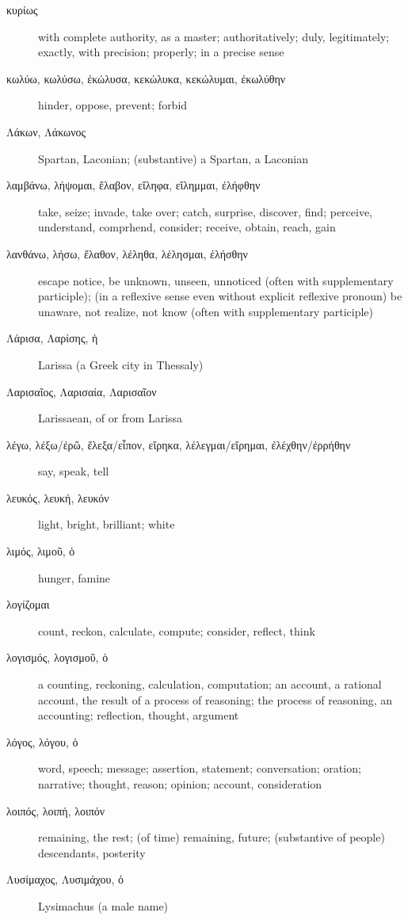 \documentclass[12pt,letterpaper]{article}
\begin{document}
\begin{description}
    \item[\textgreek{κυρίως}] \marginnote{*}with complete authority, as a master; authoritatively; duly, legitimately; exactly, with precision; properly; in a precise sense
    \item[\textgreek{κωλύω, κωλύσω, ἐκώλυσα, κεκώλυκα, κεκώλυμαι, ἐκωλύθην}] \marginnote{*}hinder, oppose, prevent; forbid
    \item[\textgreek{Λάκων, Λάκωνος}] Spartan, Laconian; (substantive) a Spartan, a Laconian
    \item[\textgreek{λαμβάνω, λήψομαι, ἔλαβον, εἴληφα, εἴλημμαι, ἐλήφθην}] \marginnote{*}take, seize; invade, take over; catch, surprise, discover, find; perceive, understand, comprhend, consider; receive, obtain, reach, gain
    \item[\textgreek{λανθάνω, λήσω, ἔλαθον, λέληθα, λέλησμαι, ἐλήσθην}] \marginnote{*}escape notice, be unknown, unseen, unnoticed (often with supplementary participle); (in a reflexive sense even without explicit reflexive pronoun) be unaware, not realize, not know (often with supplementary participle)
    \item[\textgreek{Λάρισα, Λαρίσης, ἡ}] Larissa (a Greek city in Thessaly)
    \item[\textgreek{Λαρισαῖος, Λαρισαία, Λαρισαῖον}] Larissaean, of or from Larissa
    \item[\textgreek{λέγω, λέξω/ἐρῶ, ἔλεξα/εἶπον, εἴρηκα, λέλεγμαι/εἴρημαι, ἐλέχθην/ἐρρήθην}] \marginnote{*}say, speak, tell
    \item[\textgreek{λευκός, λευκή, λευκόν}] light, bright, brilliant; white
    \item[\textgreek{λιμός, λιμοῦ, ὁ}] hunger, famine
    \item[\textgreek{λογίζομαι}] count, reckon, calculate, compute; consider, reflect, think
    \item[\textgreek{λογισμός, λογισμοῦ, ὁ}] a counting, reckoning, calculation, computation; an account, a rational account, the result of a process of reasoning; the process of reasoning, an accounting; reflection, thought, argument
    \item[\textgreek{λόγος, λόγου, ὁ}] \marginnote{*}word, speech; message; assertion, statement; conversation; oration; narrative; thought, reason; opinion; account, consideration
    \item[\textgreek{λοιπός, λοιπή, λοιπόν}] \marginnote{*}remaining, the rest; (of time) remaining, future; (substantive of people) descendants, posterity
    \item[\textgreek{Λυσίμαχος, Λυσιμάχου, ὁ}] Lysimachus (a male name)

\end{description}
\end{document}
